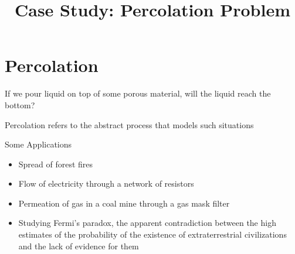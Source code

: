 \documentclass[8pt,a4paper,compress]{beamer}
\title{Case Study: Percolation Problem}
\date{}
\begin{document}
\begin{frame}
\vfill
\titlepage
\end{frame}

\section{Percolation}
\begin{frame}[fragile]
\pause

If we pour liquid on top of some porous material, will the liquid reach the bottom? 

\pause
\bigskip

Percolation refers to the abstract process that models such situations

\pause
\bigskip

Some Applications
\begin{itemize}
\pause
\item Spread of forest fires
\pause
\item Flow of electricity through a network of resistors
\pause
\item Permeation of gas in a coal mine through a gas mask filter
\pause
\item Studying Fermi's paradox, the apparent contradiction between the high estimates of the probability of the existence of extraterrestrial civilizations and the lack of evidence for them
\end{itemize}
\end{frame}
\end{document}
